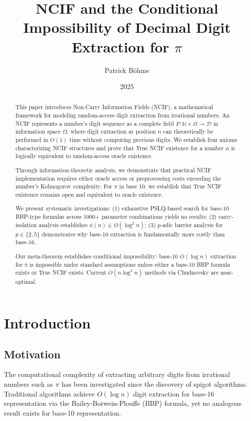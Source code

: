 \documentclass[12pt]{article}
\title{NCIF and the Conditional Impossibility of Decimal Digit Extraction for $\pi$}
\author{Patrick Böhme}
\date{2025}
\begin{document}
\maketitle

\begin{abstract}
This paper introduces Non-Carry Information Fields (NCIF), a mathematical framework for modeling random-access digit extraction from irrational numbers. An NCIF represents a number's digit sequence as a complete field $F: \mathbb{N} \times \Omega \to \mathcal{D}$ in information space $\Omega$, where digit extraction at position $n$ can theoretically be performed in $O(1)$ time without computing previous digits. We establish four axioms characterizing NCIF structures and prove that True NCIF existence for a number $\alpha$ is logically equivalent to random-access oracle existence.

Through information-theoretic analysis, we demonstrate that practical NCIF implementation requires either oracle access or preprocessing costs exceeding the number's Kolmogorov complexity. For $\pi$ in base 10, we establish that True NCIF existence remains open and equivalent to oracle existence.

We present systematic investigations: (1) exhaustive PSLQ-based search for base-10 BBP-type formulas across 1000+ parameter combinations yields no results; (2) carry-isolation analysis establishes $\kappa(n) \in \Omega(\log^2 n)$; (3) $p$-adic barrier analysis for $p \in \{2,5\}$ demonstrates why base-10 extraction is fundamentally more costly than base-16.

Our meta-theorem establishes conditional impossibility: base-10 $O(\log n)$ extraction for $\pi$ is impossible under standard assumptions unless either a base-10 BBP formula exists or True NCIF exists. Current $O(n \log^3 n)$ methods via Chudnovsky are near-optimal.
\end{abstract}


\section{Introduction}
\subsection{Motivation}
The computational complexity of extracting arbitrary digits from irrational numbers such as $\pi$ has been investigated since the discovery of spigot algorithms. Traditional algorithms achieve $O(\log n)$ digit extraction for base-16 representation via the Bailey-Borwein-Plouffe (BBP) formula, yet no analogous result exists for base-10 representation.
\end{document}
